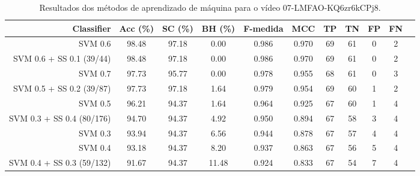 \begin{table}[!htb]
\centering
\caption{Resultados dos métodos de aprendizado de máquina para o vídeo 07-LMFAO-KQ6zr6kCPj8.}
\label{tab:07-LMFAO-KQ6zr6kCPj8}
\begin{tabular}{r|c|c|c|c|c|c|c|c|c|c}
\hline\hline
Classifier & Acc (\%) & SC (\%) & BH (\%) & F-medida & MCC & TP & TN & FP & FN \\ \hline
SVM 0.6 & 98.48 & 97.18 & 0.00 & 0.986 & 0.970 & 69 & 61 & 0 & 2 \\ 
SVM 0.6 + SS 0.1 (39/44) & 98.48 & 97.18 & 0.00 & 0.986 & 0.970 & 69 & 61 & 0 & 2 \\ 
SVM 0.7 & 97.73 & 95.77 & 0.00 & 0.978 & 0.955 & 68 & 61 & 0 & 3 \\ 
SVM 0.5 + SS 0.2 (39/87) & 97.73 & 97.18 & 1.64 & 0.979 & 0.954 & 69 & 60 & 1 & 2 \\ 
SVM 0.5 & 96.21 & 94.37 & 1.64 & 0.964 & 0.925 & 67 & 60 & 1 & 4 \\ 
SVM 0.3 + SS 0.4 (80/176) & 94.70 & 94.37 & 4.92 & 0.950 & 0.894 & 67 & 58 & 3 & 4 \\ 
SVM 0.3 & 93.94 & 94.37 & 6.56 & 0.944 & 0.878 & 67 & 57 & 4 & 4 \\ 
SVM 0.4 & 93.18 & 94.37 & 8.20 & 0.937 & 0.863 & 67 & 56 & 5 & 4 \\ 
SVM 0.4 + SS 0.3 (59/132) & 91.67 & 94.37 & 11.48 & 0.924 & 0.833 & 67 & 54 & 7 & 4 \\ 
\hline\hline
\end{tabular}
\end{table}
